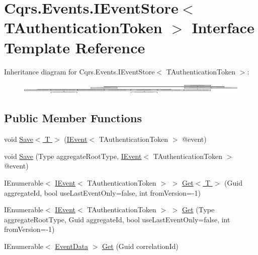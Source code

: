 \hypertarget{interfaceCqrs_1_1Events_1_1IEventStore}{}\section{Cqrs.\+Events.\+I\+Event\+Store$<$ T\+Authentication\+Token $>$ Interface Template Reference}
\label{interfaceCqrs_1_1Events_1_1IEventStore}
Inheritance diagram for Cqrs.\+Events.\+I\+Event\+Store$<$ T\+Authentication\+Token $>$\+:\begin{figure}[H]
\begin{center}
\leavevmode
\includegraphics[height=0.539499cm]{interfaceCqrs_1_1Events_1_1IEventStore}
\end{center}
\end{figure}
\subsection*{Public Member Functions}
\begin{DoxyCompactItemize}
\item 
void \hyperlink{interfaceCqrs_1_1Events_1_1IEventStore_a92e768243d6602d09b786bbd06811ce6_a92e768243d6602d09b786bbd06811ce6}{Save$<$ T $>$} (\hyperlink{interfaceCqrs_1_1Events_1_1IEvent}{I\+Event}$<$ T\+Authentication\+Token $>$ @event)
\item 
void \hyperlink{interfaceCqrs_1_1Events_1_1IEventStore_a81fb586703e7c6dea6b23d9a95f3887a_a81fb586703e7c6dea6b23d9a95f3887a}{Save} (Type aggregate\+Root\+Type, \hyperlink{interfaceCqrs_1_1Events_1_1IEvent}{I\+Event}$<$ T\+Authentication\+Token $>$ @event)
\item 
I\+Enumerable$<$ \hyperlink{interfaceCqrs_1_1Events_1_1IEvent}{I\+Event}$<$ T\+Authentication\+Token $>$ $>$ \hyperlink{interfaceCqrs_1_1Events_1_1IEventStore_add6227e2978ff8656aad79b1a51bf34c_add6227e2978ff8656aad79b1a51bf34c}{Get$<$ T $>$} (Guid aggregate\+Id, bool use\+Last\+Event\+Only=false, int from\+Version=-\/1)
\item 
I\+Enumerable$<$ \hyperlink{interfaceCqrs_1_1Events_1_1IEvent}{I\+Event}$<$ T\+Authentication\+Token $>$ $>$ \hyperlink{interfaceCqrs_1_1Events_1_1IEventStore_ae02ef6c804d0c4a92705a447bc4b2214_ae02ef6c804d0c4a92705a447bc4b2214}{Get} (Type aggregate\+Root\+Type, Guid aggregate\+Id, bool use\+Last\+Event\+Only=false, int from\+Version=-\/1)
\item 
I\+Enumerable$<$ \hyperlink{classCqrs_1_1Events_1_1EventData}{Event\+Data} $>$ \hyperlink{interfaceCqrs_1_1Events_1_1IEventStore_af398bb6768fa661ad97a9fa9ecfbd9fb_af398bb6768fa661ad97a9fa9ecfbd9fb}{Get} (Guid correlation\+Id)
\end{DoxyCompactItemize}


